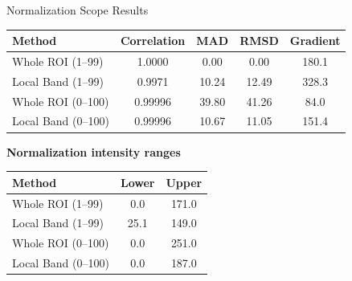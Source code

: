 \documentclass[aspectratio=169]{beamer}
\begin{document}
\begin{frame}{Normalization Scope Results}

\small

\begin{table}
\centering
\begin{tabular}{lcccc}
\toprule
Method &
Correlation &
MAD &
RMSD &
Gradient\\
\midrule
Whole ROI (1--99) & 1.0000 & 0.00 & 0.00 & 180.1\\
Local Band (1--99) & 0.9971 & 10.24 & 12.49 & 328.3\\
Whole ROI (0--100) & 0.99996 & 39.80 & 41.26 & 84.0\\
Local Band (0--100) & 0.99996 & 10.67 & 11.05 & 151.4\\
\bottomrule
\end{tabular}
\end{table}

\vspace{0.3cm}

\textbf{Normalization intensity ranges}

\begin{table}
\centering
\small
\begin{tabular}{lcc}
\toprule
Method & Lower & Upper\\
\midrule
Whole ROI (1--99) & 0.0 & 171.0\\
Local Band (1--99) & 25.1 & 149.0\\
Whole ROI (0--100) & 0.0 & 251.0\\
Local Band (0--100) & 0.0 & 187.0\\
\bottomrule
\end{tabular}
\end{table}

\end{frame}
\end{document}
